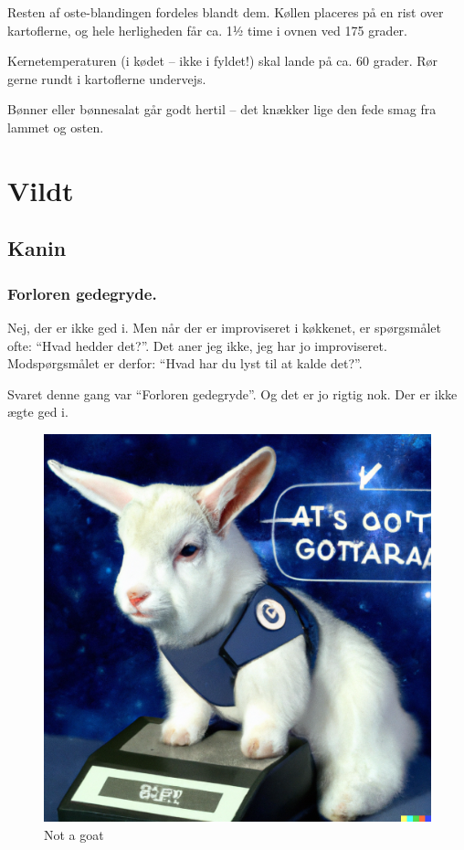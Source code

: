 \documentclass[
]{book}
\begin{document}
Resten af oste-blandingen fordeles blandt dem. Køllen placeres på en rist over kartoflerne, og hele herligheden får ca. 1½ time i ovnen ved 175 grader.

Kernetemperaturen (i kødet -- ikke i fyldet!) skal lande på ca. 60 grader. Rør gerne rundt i kartoflerne undervejs.

Bønner eller bønnesalat går godt hertil -- det knækker lige den fede smag fra lammet og osten.

\chapter{Vildt}\label{vildt}

\section{Kanin}\label{kanin}

\subsection{Forloren gedegryde.}\label{forloren-gedegryde.}

Nej, der er ikke ged i. Men når der er improviseret i køkkenet, er spørgsmålet
ofte: ``Hvad hedder det?''. Det aner jeg ikke, jeg har jo improviseret.
Modspørgsmålet er derfor: ``Hvad har du lyst til at kalde det?''.

Svaret denne gang var ``Forloren gedegryde''. Og det er jo rigtig nok. Der er ikke
ægte ged i.

\begin{figure}
\centering
\includegraphics{images/DALL-E-notagoat.png}
\caption{Not a goat}
\end{figure}
\end{document}
